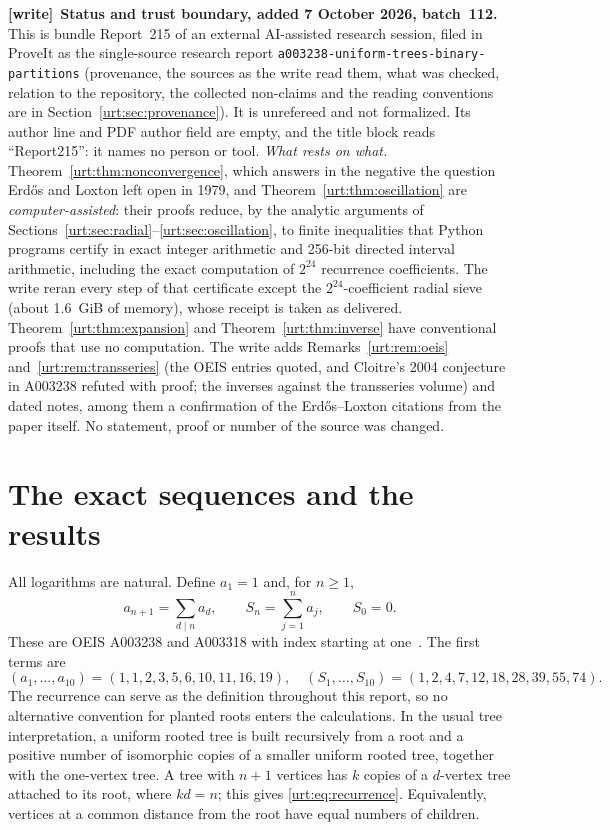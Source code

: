 \documentclass[11pt,letterpaper]{article}
\theoremstyle{remark}\newtheorem{remark}[theorem]{Remark}
\newcommand{\file}[1]{\nolinkurl{#1}}
\newenvironment{writenote}[1][]{\par\smallskip\begingroup\small
 \noindent\textbf{[write]}\if\relax\detokenize{#1}\relax\else~\textbf{#1.}\fi\ }%
 {\par\endgroup\smallskip}
\begin{document}
\begin{writenote}[Status and trust boundary, added 7 October 2026, batch~112]
This is bundle Report~215 of an external AI-assisted research session, filed
in ProveIt as the single-source research report
\file{a003238-uniform-trees-binary-partitions} (provenance, the sources as
the write read them, what was checked, relation to the repository, the
collected non-claims and the reading conventions are in
Section~\ref{urt:sec:provenance}). It is unrefereed and not formalized. Its
author line and PDF author field are empty, and the title block reads
``Report215'': it names no person or tool. \emph{What rests on what.}
Theorem~\ref{urt:thm:nonconvergence}, which answers in the negative the
question Erd\H{o}s and Loxton left open in 1979, and
Theorem~\ref{urt:thm:oscillation} are \emph{computer-assisted}: their proofs
reduce, by the analytic arguments of
Sections~\ref{urt:sec:radial}--\ref{urt:sec:oscillation}, to finite
inequalities that Python programs certify in exact integer arithmetic and
256-bit directed interval arithmetic, including the exact computation of
$2^{24}$ recurrence coefficients. The write reran every step of that
certificate except the $2^{24}$-coefficient radial sieve (about 1.6~GiB of
memory), whose receipt is taken as delivered. Theorem~\ref{urt:thm:expansion}
and Theorem~\ref{urt:thm:inverse} have conventional proofs that use no
computation. The write adds Remarks~\ref{urt:rem:oeis}
and~\ref{urt:rem:transseries} (the OEIS entries quoted, and Cloitre's 2004
conjecture in A003238 refuted with proof; the inverses against the
transseries volume) and dated notes, among them a confirmation of the
Erd\H{o}s--Loxton citations from the paper itself. No statement, proof or
number of the source was changed.
\end{writenote}
\tableofcontents

\section{The exact sequences and the results}\label{urt:sec:results}
All logarithms are natural. Define $a_1=1$ and, for $n\ge1$,
\begin{equation}\label{urt:eq:recurrence}
 a_{n+1}=\sum_{d\mid n}a_d,\qquad S_n=\sum_{j=1}^n a_j,\qquad S_0=0.
\end{equation}
These are OEIS A003238 and A003318 with index starting at one~\cite{oeis238,oeis318}. The first terms are
\[
 (a_1,\ldots,a_{10})=(1,1,2,3,5,6,10,11,16,19),\quad
 (S_1,\ldots,S_{10})=(1,2,4,7,12,18,28,39,55,74).
\]
The recurrence can serve as the definition throughout this report, so no alternative convention for planted roots enters the calculations. In the usual tree interpretation, a uniform rooted tree is built recursively from a root and a positive number of isomorphic copies of a smaller uniform rooted tree, together with the one-vertex tree. A tree with $n+1$ vertices has $k$ copies of a $d$-vertex tree attached to its root, where $kd=n$; this gives \eqref{urt:eq:recurrence}. Equivalently, vertices at a common distance from the root have equal numbers of children.
\end{document}
